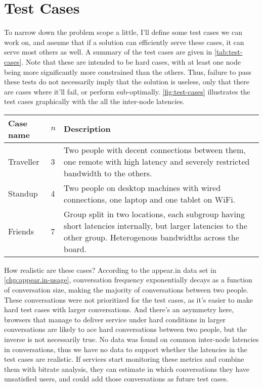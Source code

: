 \chapter{Test Cases}\label{chp:test-cases}

To narrow down the problem scope a little, I'll define some test cases we can work on, and assume that if a solution can efficiently serve these cases, it can serve most others as well. A summary of the test cases are given in \autoref{tab:test-cases}. Note that these are intended to be hard cases, with at least one node being more significantly more constrained than the others. Thus, failure to pass these tests do not necessarily imply that the solution is useless, only that there are cases where it'll fail, or perform sub-optimally. \autoref{fig:test-cases} illustrates the test cases graphically with the all the inter-node latencies.

\begin{center}
    \label{tab:test-cases}
    \begin{tabular}{| l | l | p{7cm} |}
    \hline
    \textbf{Case name} & \textbf{$n$} & \textbf{Description} \\ \hline
    Traveller & 3 & Two people with decent connections between them, one remote with high latency and severely restricted bandwidth to the others. \\ \hline
    Standup & 4 & Two people on desktop machines with wired connections, one laptop and one tablet on WiFi. \\ \hline
    Friends & 7 & Group split in two locations, each subgroup having short latencies internally, but larger latencies to the other group. Heterogenous bandwidths across the board. \\ \hline
    \end{tabular}
\end{center}

How realistic are these cases? According to the appear.in data set in \autoref{chp:appear.in-usage}, conversation frequency exponentially decays as a function of conversation size, making the majority of conversations between two people. These conversations were not prioritized for the test cases, as it's easier to make hard test cases with larger conversations. And there's an asymmetry here, browsers that manage to deliver service under hard conditions in larger conversations are likely to ace hard conversations between two people, but the inverse is not necessarily true. No data was found on common inter-node latencies in conversations, thus we have no data to support whether the latencies in the test cases are realistic. If services start monitoring these metrics and combine them with bitrate analysis, they can estimate in which conversations they have unsatisfied users, and could add those conversations as future test cases.

